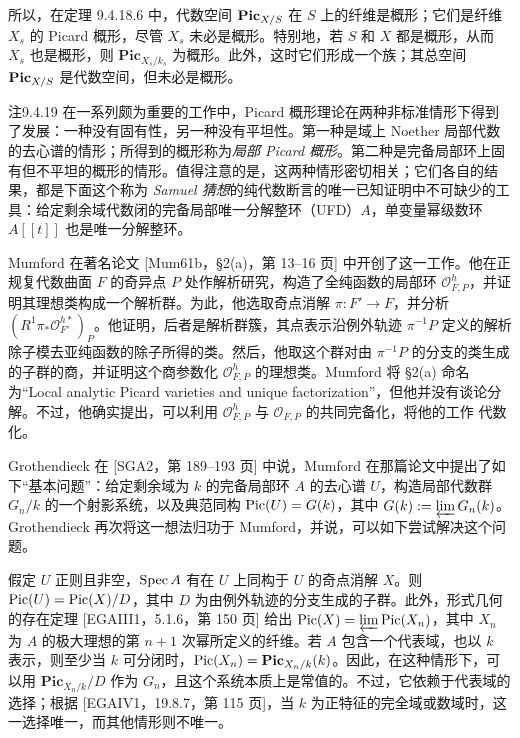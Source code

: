 所以，在定理 9.4.18.6 中，代数空间 $\mathbf{Pic}_{X/S}$ 在 $S$ 上的纤维是概形；它们是纤维 $X_s$ 的 Picard 概形，尽管 $X_s$ 未必是概形。特别地，若 $S$ 和 $X$ 都是概形，从而 $X_s$ 也是概形，则 $\mathbf{Pic}_{X_s/k_s}$ 为概形。此外，这时它们形成一个族；其总空间 $\mathbf{Pic}_{X/S}$ 是代数空间，但未必是概形。

\begin{origstatement}{注}{9.4.19}\label{ch09s04:9.4.19}
在一系列颇为重要的工作中，Picard 概形理论在两种非标准情形下得到了发展：一种没有固有性，另一种没有平坦性。第一种是域上 Noether 局部代数的去心谱的情形；所得到的概形称为\emph{局部 Picard 概形}。第二种是完备局部环上固有但不平坦的概形的情形。值得注意的是，这两种情形密切相关；它们各自的结果，都是下面这个称为 \emph{Samuel 猜想}的纯代数断言的唯一已知证明中不可缺少的工具：给定剩余域代数闭的完备局部唯一分解整环（UFD）$A$，单变量幂级数环 $A[[t]]$ 也是唯一分解整环。

Mumford 在著名论文 [Mum61b，§2(a)，第 13--16 页] 中开创了这一工作。他在正规复代数曲面 $F$ 的奇异点 $P$ 处作解析研究，构造了全纯函数的局部环 $\mathcal O^h_{F,P}$，并证明其理想类构成一个解析群。为此，他选取奇点消解 $\pi:F'\to F$，并分析 $(R^1\pi_*\mathcal O_{F'}^{h*})_P$。他证明，后者是解析群簇，其点表示沿例外轨迹 $\pi^{-1}P$ 定义的解析除子模去亚纯函数的除子所得的类。然后，他取这个群对由 $\pi^{-1}P$ 的分支的类生成的子群的商，并证明这个商参数化 $\mathcal O^h_{F,P}$ 的理想类。Mumford 将 §2(a) 命名为“Local analytic Picard varieties and unique factorization”，但他并没有谈论分解。不过，他确实提出，可以利用 $\mathcal O^h_{F,P}$ 与 $\mathcal O_{F,P}$ 的共同完备化，将他的工作
代数化。

Grothendieck 在 [SGA2，第 189--193 页] 中说，Mumford 在那篇论文中提出了如下“基本问题”：给定剩余域为 $k$ 的完备局部环 $A$ 的去心谱 $U$，构造局部代数群 $G_n/k$ 的一个射影系统，以及典范同构 $\operatorname{Pic}(U)=G(k)$，其中 $G(k):=\varprojlim G_n(k)$。Grothendieck 再次将这一想法归功于 Mumford，并说，可以如下尝试解决这个问题。

假定 $U$ 正则且非空，$\operatorname{Spec} A$ 有在 $U$ 上同构于 $U$ 的奇点消解 $X$。则 $\operatorname{Pic}(U)=\operatorname{Pic}(X)/D$，其中 $D$ 为由例外轨迹的分支生成的子群。此外，形式几何的存在定理 [EGAIII1，5.1.6，第 150 页] 给出 $\operatorname{Pic}(X)=\varprojlim\operatorname{Pic}(X_n)$，其中 $X_n$ 为 $A$ 的极大理想的第 $n+1$ 次幂所定义的纤维。若 $A$ 包含一个代表域，也以 $k$ 表示，则至少当 $k$ 可分闭时，$\operatorname{Pic}(X_n)=\mathbf{Pic}_{X_n/k}(k)$。因此，在这种情形下，可以用 $\mathbf{Pic}_{X_n/k}/D$ 作为 $G_n$，且这个系统本质上是常值的。不过，它依赖于代表域的选择；根据 [EGAIV1，19.8.7，第 115 页]，当 $k$ 为正特征的完全域或数域时，这一选择唯一，而其他情形则不唯一。


\end{origstatement}
